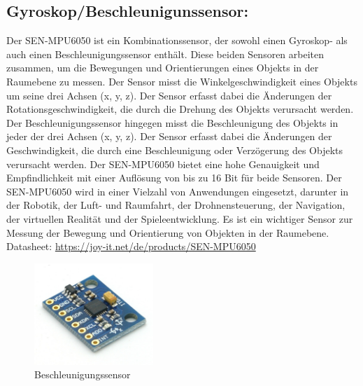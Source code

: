 \subsection*{Gyroskop/Beschleunigunssensor:}
Der SEN-MPU6050 ist ein Kombinationssensor, der sowohl einen Gyroskop- als auch einen Beschleunigungssensor enthält. 
Diese beiden Sensoren arbeiten zusammen, um die Bewegungen und Orientierungen eines Objekts in der Raumebene zu messen. 
Der Sensor misst die Winkelgeschwindigkeit eines Objekts um seine drei Achsen (x, y, z). Der Sensor erfasst dabei die Änderungen der Rotationsgeschwindigkeit, die durch die Drehung des Objekts verursacht werden. 
Der Beschleunigungssensor hingegen misst die Beschleunigung des Objekts in jeder der drei Achsen (x, y, z). 
Der Sensor erfasst dabei die Änderungen der Geschwindigkeit, die durch eine Beschleunigung oder Verzögerung des Objekts verursacht werden. 
Der SEN-MPU6050 bietet eine hohe Genauigkeit und Empfindlichkeit mit einer Auflösung von bis zu 16 Bit für beide Sensoren.  
Der SEN-MPU6050 wird in einer Vielzahl von Anwendungen eingesetzt, darunter in der Robotik, der Luft- und Raumfahrt, der Drohnensteuerung, der Navigation, der virtuellen Realität und der Spieleentwicklung. 
Es ist ein wichtiger Sensor zur Messung der Bewegung und Orientierung von Objekten in der Raumebene. 
\newline
Datasheet: \url{https://joy-it.net/de/products/SEN-MPU6050} 

\begin{figure}[b]
    \centering
    \includegraphics[width=0.4\textwidth]{./pics/BeschlSensorBild.jpeg}
    \caption{Beschleunigungssensor}
    \label{fig:Beschleunigungssensor}
\end{figure}
\cite{Gyroskop/Beschleunigungssensor}



